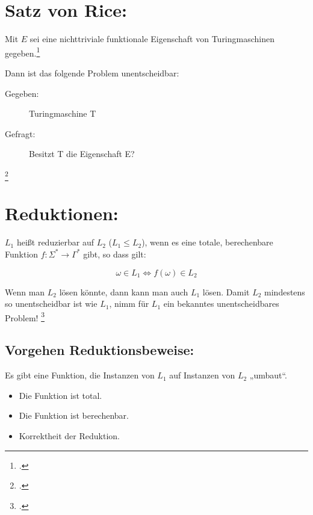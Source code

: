 \documentclass{bschlangaul-haupt}
\begin{document}
\section{Satz von Rice:}

Mit $E$ sei eine nichttriviale funktionale Eigenschaft von
Turingmaschinen gegeben.\footcite[Seite 324]{hoffmann}

Dann ist das folgende Problem unentscheidbar:
\begin{description}
\item[Gegeben:] Turingmaschine T

\item[Gefragt:] Besitzt T die Eigenschaft E?
\end{description}
\footcite[Seite 43]{theo:fs:4}

%

\section{Reduktionen:}

$L_1$ heißt reduzierbar auf $L_2$ ($L_1 \leq L_2$), wenn es eine totale,
berechenbare Funktion $f \colon \Sigma^* \rightarrow \Gamma^*$ gibt, so
dass gilt:

\begin{displaymath}
\omega \in L_1 \Leftrightarrow f(\omega) \in L_2
\end{displaymath}

Wenn man $L_2$ lösen könnte, dann kann man auch $L_1$ lösen. Damit $L_2$
mindestens so unentscheidbar ist wie $L_1$, nimm für $L_1$ ein bekanntes
unentscheidbares Problem!
\footcite[Seite 44]{theo:fs:4}

\subsection{Vorgehen Reduktionsbeweise:}

Es gibt eine Funktion, die Instanzen von $L_1$ auf Instanzen von $L_2$
„umbaut“.

\begin{itemize}
\item Die Funktion ist total.
\item Die Funktion ist berechenbar.
\item Korrektheit der Reduktion.
\end{itemize}
\end{document}
